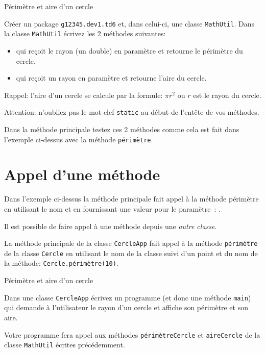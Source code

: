 \documentclass[a4paper,11pt]{article}
\begin{document}
	 \begin{Exercice}{Périmètre et aire d'un cercle}
		
		Créer un package \texttt{g12345.dev1.td6} et, dans celui-ci, une classe \texttt{MathUtil}.
		Dans la classe \texttt{MathUtil} écrivez les 2 méthodes suivantes: 
		\begin{itemize}
			\item	{} 
				qui reçoit le rayon (un double) en paramètre et retourne le périmètre du cercle.
			\item {} 
				qui reçoit un rayon en paramètre et retourne l'aire du cercle.
		\end{itemize}
		
		Rappel: l'aire d'un cercle se calcule par la formule: $\pi r^2$ ou  $r$ est le rayon du cercle.
		
		Attention: n'oubliez pas le mot-clef \texttt{static} au début de l'entête de vos méthodes.
		
		Dans la méthode principale testez ces 2 méthodes comme cela est fait dans l'exemple ci-dessus avec la méthode 
		\texttt{périmètre}.
	\end{Exercice} 


\section{Appel d'une méthode}

	Dans l'exemple ci-dessus la méthode principale fait appel à la méthode périmètre en utilisant le nom 
	et en fournissant une valeur pour le paramètre~: 
	.
	
	Il est possible de faire appel à une méthode depuis une \emph{autre classe}.
	

	La méthode principale de la classe \texttt{CercleApp} fait appel à la méthode \texttt{périmètre}
	de la classe \texttt{Cercle} en utilisant le nom de la classe suivi d'un point et du nom de la méthode: \texttt{Cercle.périmètre(10)}.
	
	 \begin{Exercice}{Périmètre et aire d'un cercle}
		
		Dans une classe \texttt{CercleApp} écrivez un programme (et donc une méthode \texttt{main})
		qui demande à l'utilisateur le rayon d'un cercle et affiche son périmètre et son aire.
		
		Votre programme fera appel aux méthodes \texttt{périmètreCercle} et \texttt{aireCercle} de la classe
		\texttt{MathUtil} écrites précédemment.
	\end{Exercice} 
	
\end{document}
